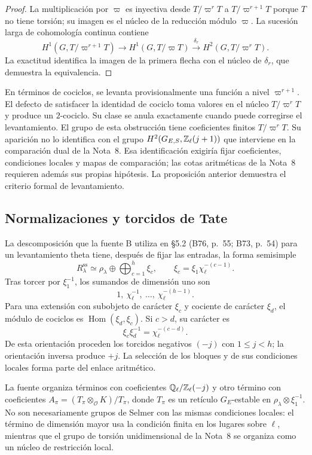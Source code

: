 \begin{proof}
La multiplicación por $\varpi$ es inyectiva
desde $T/\varpi^rT$ a $T/\varpi^{r+1}T$ porque
$T$ no tiene torsión; su imagen es el núcleo de
la reducción módulo $\varpi$.
La sucesión larga de cohomología continua contiene
\[
 H^1(G,T/\varpi^{r+1}T)
 \longrightarrow H^1(G,T/\varpi T)
 \xrightarrow{\delta_r} H^2(G,T/\varpi^rT).
\]
La exactitud identifica la imagen de la primera flecha
con el núcleo de $\delta_r$, que demuestra la equivalencia.
\end{proof}

En términos de cociclos, se levanta provisionalmente
una función a nivel $\varpi^{r+1}$. El defecto de satisfacer
la identidad de cociclo toma valores en el núcleo
$T/\varpi^rT$ y produce un $2$-cociclo. Su clase se
anula exactamente cuando puede corregirse el levantamiento.
El grupo de esta obstrucción tiene coeficientes finitos
$T/\varpi^rT$. Su aparición no lo identifica con el grupo
$H^2(G_{E,S},\mathbb{Z}_\ell(j+1))$ que interviene en la comparación
dual de la Nota~8. Esa identificación exigiría fijar
coeficientes, condiciones locales y mapas de comparación;
las cotas aritméticas de la Nota~8 requieren además sus
propias hipótesis. La proposición anterior demuestra el
criterio formal de levantamiento.

\subsection{Normalizaciones y torcidos de Tate}

La descomposición que la fuente B utiliza en §5.2
(B76, p.~55; B73, p.~54) para un
levantamiento theta tiene, después de fijar las entradas,
la forma semisimple
\begin{equation}
 R_\lambda^{\mathrm{ss}}
 \simeq\rho_\lambda\oplus
 \bigoplus_{c=1}^{h}\xi_c,
 \qquad
 \xi_c=\xi_1\chi_\ell^{-(c-1)}.
 \label{eq:cs-twists}
\end{equation}
Tras torcer por $\xi_1^{-1}$, los sumandos de dimensión
uno son
\[
 1,\ \chi_\ell^{-1},\ \ldots,\
 \chi_\ell^{-(h-1)}.
\]
Para una extensión con subobjeto de carácter $\xi_c$ y
cociente de carácter $\xi_d$, el módulo de cociclos es
$\operatorname{Hom}(\xi_d,\xi_c)$. Si $c>d$, su carácter es
\[
 \xi_c\xi_d^{-1}=\chi_\ell^{-(c-d)}.
\]
De esta orientación proceden los torcidos negativos $(-j)$
con $1\le j<h$; la orientación inversa produce $+j$.
La selección de los bloques y de sus condiciones locales
forma parte del enlace aritmético.

La fuente organiza términos con coeficientes
$\mathbb{Q}_\ell/\mathbb{Z}_\ell(-j)$ y otro término con coeficientes
$A_\pi=(T_\pi\otimes_{\mathcal O}K)/T_\pi$, donde
$T_\pi$ es un retículo $G_E$-estable en
$\rho_\lambda\otimes\xi_1^{-1}$.
No son necesariamente grupos de Selmer con las mismas
condiciones locales: el término de dimensión mayor
usa la condición finita en los lugares sobre $\ell$,
mientras que el grupo de torsión unidimensional de la
Nota~8 se organiza como un núcleo de restricción local.

